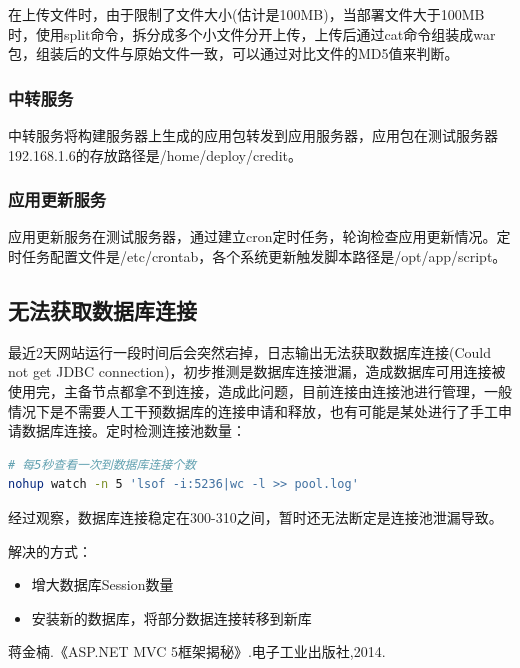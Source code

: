 \documentclass{book}
\begin{document}
在上传文件时，由于限制了文件大小(估计是100MB)，当部署文件大于100MB时，使用split命令，拆分成多个小文件分开上传，上传后通过cat命令组装成war包，组装后的文件与原始文件一致，可以通过对比文件的MD5值来判断。

\subsubsection{中转服务}

中转服务将构建服务器上生成的应用包转发到应用服务器，应用包在测试服务器192.168.1.6的存放路径是/home/deploy/credit。


\subsubsection{应用更新服务}

应用更新服务在测试服务器，通过建立cron定时任务，轮询检查应用更新情况。定时任务配置文件是/etc/crontab，各个系统更新触发脚本路径是/opt/app/script。


\subsection{无法获取数据库连接}

最近2天网站运行一段时间后会突然宕掉，日志输出无法获取数据库连接(Could not get JDBC connection)，初步推测是数据库连接泄漏，造成数据库可用连接被使用完，主备节点都拿不到连接，造成此问题，目前连接由连接池进行管理，一般情况下是不需要人工干预数据库的连接申请和释放，也有可能是某处进行了手工申请数据库连接。定时检测连接池数量：

\begin{lstlisting}[language=Bash]
# 每5秒查看一次到数据库连接个数
nohup watch -n 5 'lsof -i:5236|wc -l >> pool.log'
\end{lstlisting}

经过观察，数据库连接稳定在300-310之间，暂时还无法断定是连接池泄漏导致。



解决的方式：

\begin{itemize}
	\item{增大数据库Session数量}
	\item{安装新的数据库，将部分数据连接转移到新库}
\end{itemize}




\begin{thebibliography}{0}
蒋金楠.《ASP.NET MVC 5框架揭秘》.电子工业出版社,2014.
\end{thebibliography}

\end{document}
